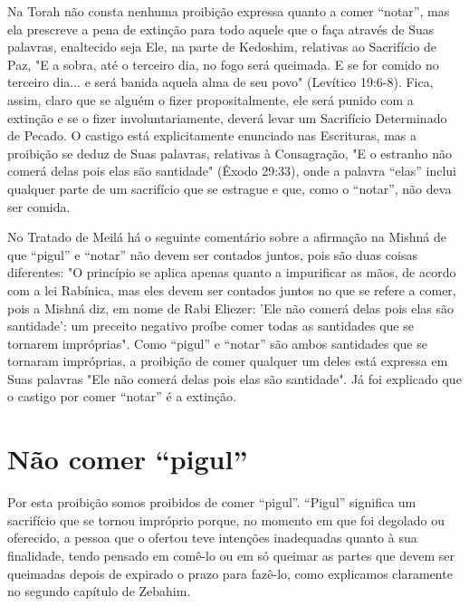 Na Torah não consta nenhuma proibição expressa quanto a comer ``notar'',
mas ela prescreve a pena de extinção para todo aquele que o faça
atra­vés de Suas palavras, enaltecido seja Ele, na parte de Kedoshim,
relativas ao Sacrifício de Paz, "E a sobra, até o terceiro dia, no fogo
será queimada. E se for comido no terceiro dia... e será banida aquela
alma de seu povo" (Levítico 19:6-8). Fica, assim, claro que se alguém o
fizer propositalmente, ele será puni­do com a extinção e se o fizer
involuntariamente, deverá levar um Sacrifício Determinado de Pecado. O
castigo está explicitamente enunciado nas Escritu­ras, mas a proibição
se deduz de Suas palavras, relativas à Consagração, "E o estranho não
comerá delas pois elas são santidade" (Êxodo 29:33), onde a pala­vra
``elas'' inclui qualquer parte de um sacrifício que se estrague e que,
como o ``notar'', não deva ser comida.

No Tratado de Meilá há o seguinte comentário sobre a afirmação na Mishná
de que ``pigul'' e ``notar'' não devem ser contados juntos, pois são duas
coisas diferentes: "O princípio se aplica apenas quanto a impurificar as
mãos, de acordo com a lei Rabínica, mas eles devem ser contados juntos
no que se refere a comer, pois a Mishná diz, em nome de Rabi Eliezer:
'Ele não comerá delas pois elas são santidade': um preceito negativo
proíbe comer todas as san­tidades que se tornarem impróprias". Como
``pigul'' e ``notar'' são ambos san­tidades que se tornaram impróprias, a
proibição de comer qualquer um deles está expressa em Suas palavras "Ele
não comerá delas pois elas são santidade". Já foi explicado que o
castigo por comer ``notar'' é a extinção.

\section{Não comer ``pigul''}

Por esta proibição somos proibidos de comer ``pigul''. ``Pigul'' sig­nifica
um sacrifício que se tornou impróprio porque, no momento em que foi
degolado ou oferecido, a pessoa que o ofertou teve intenções inadequadas
quan­to à sua finalidade, tendo pensado em comê-lo ou em só queimar as
partes que devem ser queimadas depois de expirado o prazo para fazê-lo,
como explica­mos claramente no segundo capítulo de Zebahim.

